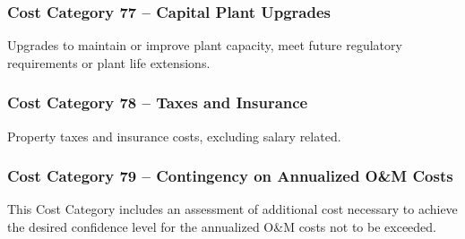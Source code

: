 \subsubsection*{Cost Category 77 – Capital Plant Upgrades}
Upgrades to maintain or improve plant capacity, meet future regulatory requirements or plant life extensions.

\subsubsection*{Cost Category 78 – Taxes and Insurance}
Property taxes and insurance costs, excluding salary related.

\subsubsection*{Cost Category 79 – Contingency on Annualized O\&M Costs}
This Cost Category includes an assessment of additional cost necessary to achieve the desired confidence level for the annualized O\&M costs not to be exceeded.
